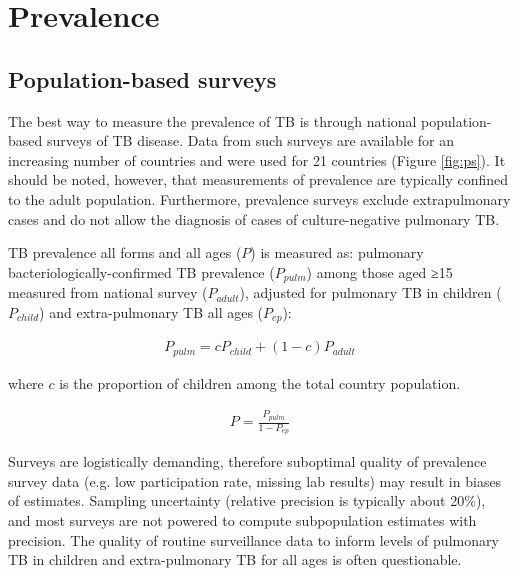 \section{Prevalence}

\subsection{Population-based surveys}
The best way to measure the prevalence of TB is through national population-based surveys of TB disease\cite{18713496}\cite{WHO2011}. Data from such surveys are available for an increasing number of countries and were used for 21 countries (Figure \ref{fig:ps}). It should be noted, however, that measurements of prevalence are typically confined to the adult population. Furthermore, prevalence surveys exclude extrapulmonary cases and do not allow the diagnosis of cases of culture-negative pulmonary TB. 

TB prevalence all forms and all ages ($P$) is measured as: pulmonary bacteriologically-confirmed TB prevalence ($P_{pulm}$) among those aged ≥15 measured from national survey ($P_{adult}$), adjusted for pulmonary TB in children ($P_{child}$) and extra-pulmonary TB all ages ($P_{ep}$):

\begin{align*}
P_{pulm} = c P_{child} + (1 − c) P_{adult}
\end{align*}

where $c$ is the proportion of children among the total country population.

\begin{align*}
P = \frac{P_{pulm}}{1 - P_{ep}}
\end{align*}

Surveys are logistically demanding, therefore suboptimal quality of prevalence survey data (e.g. low participation rate, missing lab results) may result in biases of estimates. Sampling uncertainty (relative precision is typically about 20\%), and most surveys are not powered to compute subpopulation estimates with precision. The  quality of routine surveillance data to inform levels of pulmonary TB in children and extra-pulmonary TB for all ages is often questionable.



 